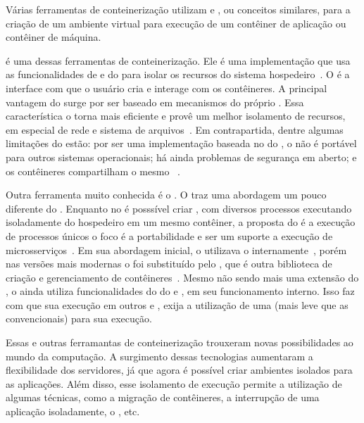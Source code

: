 Várias ferramentas de conteinerização utilizam \namespaces e \cgroups, ou conceitos similares, para a criação de um ambiente virtual para execução de um contêiner de aplicação ou contêiner de máquina.

\lxc é uma dessas ferramentas de conteinerização. Ele é uma implementação que usa as funcionalidades de \namespaces e \cgroups do \linux para isolar os recursos do sistema hospedeiro~\cite{watada2019emerging}. O \lxd é a interface com que o usuário cria e interage com os contêineres. A principal vantagem do \lxc surge por ser baseado em mecanismos do próprio . Essa característica o torna mais eficiente e provê um melhor isolamento de recursos, em especial de rede e sistema de arquivos~\cite{dua2014virtualization}. Em contrapartida, dentre algumas limitações do \lxc estão: por ser uma implementação baseada no  do \linux, o \lxc não é portável para outros sistemas operacionais; há ainda problemas de segurança em aberto; e os contêineres compartilham o mesmo ~\cite{dua2014virtualization}.

Outra ferramenta muito conhecida é o \docker. O \docker traz uma abordagem um pouco diferente do \lxc. Enquanto no \lxc é posssível criar \vms, com diversos processos executando isoladamente do hospedeiro em um mesmo contêiner, a proposta do \docker é a execução de processos únicos \ie o foco é a portabilidade e ser um suporte a execução de microsserviços~\cite{lxcvsdocker}. Em sua abordagem inicial, o \docker utilizava o \lxc internamente~\cite{dua2014virtualization}, porém nas versões mais modernas o \lxc foi substituído pelo \conteinerd, que é outra biblioteca de criação e gerenciamento de contêineres~\cite{containerd}. Mesmo não sendo mais uma extensão do \lxc, o \docker ainda utiliza funcionalidades do  do \linux \eg \namespaces e \cgroups, em seu funcionamento interno. Isso faz com que sua execução em outros \sos \eg \mac e \windows, exija a utilização de uma \vm (mais leve que as convencionais) para sua execução.

Essas e outras ferramantas de conteinerização trouxeram novas possibilidades ao mundo da computação. A surgimento dessas tecnologias aumentaram a flexibilidade dos servidores, já que agora é possível criar ambientes isolados para as aplicações. Além disso, esse isolamento de execução permite a utilização de algumas técnicas, como a migração de contêineres, a interrupção de uma aplicação isoladamente, o \checkpointing, etc.


